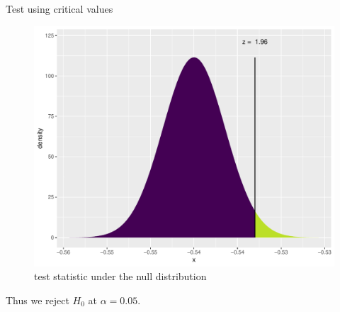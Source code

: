 \documentclass[10pt]{beamer}\usepackage[]{graphicx}\usepackage[]{color}
\makeatletter
\def\maxwidth{ %
  \ifdim\Gin@nat@width>\linewidth
    \linewidth
  \else
    \Gin@nat@width
  \fi
}
\newenvironment{knitrout}{}{} %
\makeatother
\begin{document}
\begin{frame}[fragile]{Test using critical values}
\begin{minipage}{0.47\textwidth}
\begin{knitrout}
\begin{figure}
{\centering \includegraphics[width=\maxwidth]{figure/unnamed-chunk-5-1} 

}

\caption[test statistic under the null distribution]{test statistic under the null distribution}\label{fig:unnamed-chunk-5}
\end{figure}


\end{knitrout}
	\end{minipage}	
	
	Thus we reject $H_0$ at $\alpha = 0.05$.
\end{frame}
\end{document}
